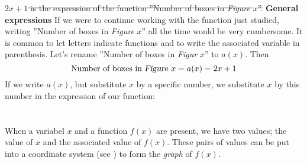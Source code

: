 \st{$ {2x+1} $ is the expression of the function ''Number of boxes in \textsl{Figure }$ x $''.}
\newpage
\textbf{General expressions} \os
If we were to continue working with the function just studied, writing ''Number of boxes in \textsl{Figure }$ x $'' all the time would be very cumbersome. It is common to let letters indicate functions and to write the associated variable in parenthesis. Let's rename ''Number of boxes in \textsl{Figur} $ x $'' to $ a(x) $. Then
\[ \text{Number of boxes in \textsl{Figure }}x=a(x)=2x+1 \]
If we write $ a(x) $, but substitute $ x $ by a specific number, we substitute $ x $ by this number in the expression of our function:
\newpage
{}
\section{\lingraf}
When a variabel $ x $ and a function $ f(x)  $ are present, we have two values; the value of $ x $ and the associated value of $ f(x) $. These pairs of values can be put into a coordinate system (see ) to form the  \textit{graph} of $ f(x) $. \vsk

